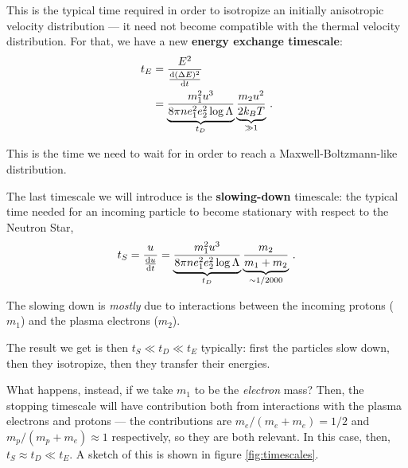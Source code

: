\documentclass[main.tex]{subfiles}
\begin{document}
This is the typical time required in order to isotropize an initially anisotropic velocity distribution --- it need not become compatible with the thermal velocity distribution. 
For that, we have a new \textbf{energy exchange timescale}: 
%
\begin{align}
t_E &= \frac{E^2}{\dv{(\Delta E)^2}{t}} \\
&= \underbrace{\frac{m_1^2u^3}{8 \pi n e_1^2 e_2^2 \log \Lambda }}_{t_D} \underbrace{\frac{m_2 u^2}{2 k_B T}}_{\gg 1} 
\,.
\end{align}

This is the time we need to wait for in order to reach a Maxwell-Boltzmann-like distribution. 

The last timescale we will introduce is the \textbf{slowing-down} timescale: the typical time needed for an incoming particle to become stationary with respect to the Neutron Star,
%
\begin{align}
t_S = \frac{u}{\dv{u}{t}} = \underbrace{\frac{m_1^2u^3}{8 \pi n e_1^2 e_2^2 \log \Lambda }}_{t_D} \underbrace{\frac{m_2}{m_1 + m_2 }}_{\sim 1/2000}
\,.
\end{align}

The slowing down is \emph{mostly} due to interactions between the incoming protons (\(m_1 \)) and the plasma electrons (\(m_2 \)).




The result we get is then \(t_S \ll t_D \ll t_E\) typically: first the particles slow down, then they isotropize, then they transfer their energies.

What happens, instead, if we take \(m_1 \) to be the \emph{electron} mass? Then, the stopping timescale will have contribution both from interactions with the plasma electrons and protons --- the contributions are \(m_e / (m_e + m_e) = 1/2\) and \(m_p / (m_p + m_e) \approx 1\) respectively, so they are both relevant. In this case, then, \(t_S \approx t_D \ll t_E\). 
A sketch of this is shown in figure \ref{fig:timescales}.
\end{document}
